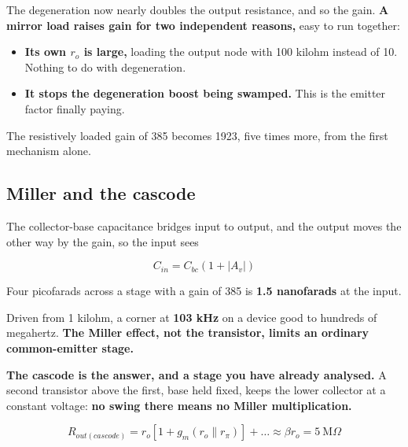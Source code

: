 The degeneration now nearly doubles the output resistance, and so the gain. \textbf{A mirror load raises gain for two independent reasons,} easy to run together:

\begin{itemize}
  \item \textbf{Its own $r_o$ is large,} loading the output node with 100 kilohm instead of 10. Nothing to do with degeneration.
  \item \textbf{It stops the degeneration boost being swamped.} This is the emitter factor finally paying.
\end{itemize}
The resistively loaded gain of 385 becomes 1923, five times more, from the first mechanism alone.

\subsection{Miller and the cascode}
\label{c7:sec:b5}
The collector-base capacitance bridges input to output, and the output moves the other way by the gain, so the input sees

\[
  C_{in} = C_{bc}(1 + |A_v|)
\]

Four picofarads across a stage with a gain of 385 is \textbf{1.5 nanofarads} at the input.


Driven from 1 kilohm, a corner at \textbf{103 kHz} on a device good to hundreds of megahertz. \textbf{The Miller effect, not the transistor, limits an ordinary common-emitter stage.}


\textbf{The cascode is the answer, and a stage you have already analysed.} A second transistor above the first, base held fixed, keeps the lower collector at a constant voltage: \textbf{no swing there means no Miller multiplication.}

\[
  R_{out(cascode)} = r_o\left[1 + g_m(r_o \parallel r_\pi)\right] + \dots \approx \beta r_o = 5\ \text{M}\Omega
\]

